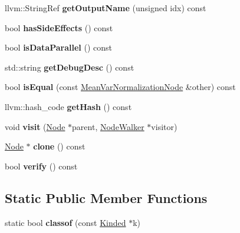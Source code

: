 \begin{DoxyCompactItemize}
llvm\+::\+String\+Ref {\bfseries get\+Output\+Name} (unsigned idx) const
\item 
\mbox{\label{classglow_1_1_mean_var_normalization_node_af53b86ce4ed41c9a272b77c091311b78}} 
bool {\bfseries has\+Side\+Effects} () const
\item 
\mbox{\label{classglow_1_1_mean_var_normalization_node_a018ba275a982f677025e9f330f60f925}} 
bool {\bfseries is\+Data\+Parallel} () const
\item 
\mbox{\label{classglow_1_1_mean_var_normalization_node_aaa79caa915b6852f2fe3d12d22da86dc}} 
std\+::string {\bfseries get\+Debug\+Desc} () const
\item 
\mbox{\label{classglow_1_1_mean_var_normalization_node_aeae5749cffb2fb74a23df6f1cee0bb11}} 
bool {\bfseries is\+Equal} (const \hyperlink{classglow_1_1_mean_var_normalization_node}{Mean\+Var\+Normalization\+Node} \&other) const
\item 
\mbox{\label{classglow_1_1_mean_var_normalization_node_a5c685738fc708c2f3bdb25a4c5cca79e}} 
llvm\+::hash\+\_\+code {\bfseries get\+Hash} () const
\item 
\mbox{\label{classglow_1_1_mean_var_normalization_node_a26a3b9a97c3a684188ad17bbf2c0c5a1}} 
void {\bfseries visit} (\hyperlink{classglow_1_1_node}{Node} $\ast$parent, \hyperlink{classglow_1_1_node_walker}{Node\+Walker} $\ast$visitor)
\item 
\mbox{\label{classglow_1_1_mean_var_normalization_node_a1f71e9979ccce4dc453f532114f104c4}} 
\hyperlink{classglow_1_1_node}{Node} $\ast$ {\bfseries clone} () const
\item 
\mbox{\label{classglow_1_1_mean_var_normalization_node_a3d73864bc4d275609c02d2d6136195cc}} 
bool {\bfseries verify} () const
\end{DoxyCompactItemize}
\subsection*{Static Public Member Functions}
\begin{DoxyCompactItemize}
\item 
\mbox{\label{classglow_1_1_mean_var_normalization_node_af451cdd9f96973aa0cc883c80a913b51}} 
static bool {\bfseries classof} (const \hyperlink{classglow_1_1_kinded}{Kinded} $\ast$k)
\end{DoxyCompactItemize}
